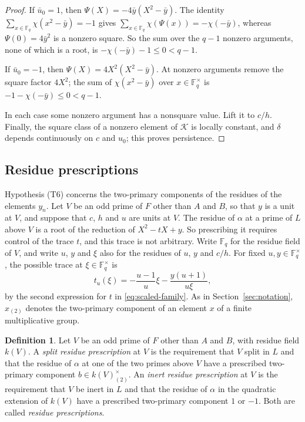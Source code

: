 \documentclass[11pt]{article}
\theoremstyle{plain}
\theoremstyle{definition}
\newtheorem{definition}[theorem]{Definition}
\theoremstyle{remark}
\newcommand{\F}{\mathbb F}
\begin{document}
\begin{proof}
If $\bar u_0=1$, then $\Psi(X)=-4\bar y(X^2-\bar y)$.  The identity
$\sum_{x\in\F_q}\chi(x^2-\bar y)=-1$ gives
$\sum_{x\in\F_q}\chi(\Psi(x))=-\chi(-\bar y)$, whereas $\Psi(0)=4\bar y^2$
is a nonzero square.  So the sum over the $q-1$ nonzero arguments, none of
which is a root, is $-\chi(-\bar y)-1\le0<q-1$.

If $\bar u_0=-1$, then $\Psi(X)=4X^2(X^2-\bar y)$.  At nonzero arguments
remove the square factor $4X^2$; the sum of $\chi(x^2-\bar y)$ over
$x\in\F_q^\times$ is $-1-\chi(-\bar y)\le0<q-1$.

In each case some nonzero argument has a nonsquare value.  Lift it to
$c/h$.  Finally, the square class of a nonzero element of $\mathcal K$ is
locally constant, and $\delta$ depends continuously on $c$ and $u_0$; this
proves persistence.
\end{proof}

\subsection{Residue prescriptions}\label{sec:residue-prescriptions}

Hypothesis (T6) concerns the two-primary components of the residues of the
elements $y_n$.  Let $V$ be an odd prime of $F$ other than $A$ and $B$, so
that $y$ is a unit at $V$, and suppose that $c$, $h$ and $u$ are units at
$V$.  The residue of $\alpha$ at a prime of $L$ above $V$ is a root of the
reduction of $X^2-tX+y$.  So prescribing it requires control of the trace
$t$, and this trace is not arbitrary.  Write $\F_q$ for the residue field
of $V$, and write $u$, $y$ and $\xi$ also for the residues of $u$, $y$
and $c/h$.  For fixed $u,y\in\F_q^\times$, the possible trace at
$\xi\in\F_q^\times$ is
\begin{equation}\label{eq:trace-map}
 t_u(\xi)=-\frac{u-1}{u}\xi-\frac{y(u+1)}{u\xi},
\end{equation}
by the second expression for $t$ in \eqref{eq:scaled-family}.  As in
Section~\ref{sec:notation}, $x_{(2)}$ denotes the two-primary component of
an element $x$ of a finite multiplicative group.

\begin{definition}\label{def:residue-prescription}
Let $V$ be an odd prime of $F$ other than $A$ and $B$, with residue field
$k(V)$.  A \emph{split
residue prescription} at $V$ is the requirement that $V$ split in $L$ and
that the residue of $\alpha$ at one of the two primes above $V$ have a
prescribed two-primary component $b\in k(V)^\times_{(2)}$.  An \emph{inert
residue prescription} at $V$ is the requirement that $V$ be inert in $L$
and that the residue of $\alpha$ in the quadratic extension of $k(V)$ have
a prescribed two-primary component $1$ or $-1$.  Both are called
\emph{residue prescriptions}.
\end{definition}
\end{document}
